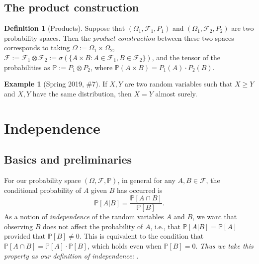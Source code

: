 \documentclass[12pt,reqno]{article}
\renewcommand{\emph}[1]{\textit{#1}}
\theoremstyle{plain}
\theoremstyle{definition}
\newtheorem{definition}[theorem]{Definition}
\newtheorem{example}[theorem]{Example}
\begin{document}
\subsection{The product construction} 

\begin{definition}[Products]
Suppose that $(\Omega_1, \mathcal{F}_1, P_1)$ and 
$(\Omega_1, \mathcal{F}_2, P_2)$ are two probability spaces. 
Then the \emph{product construction} between these two spaces 
corresponds to taking $\Omega := \Omega_1 \times \Omega_2$, 
$\mathcal{F} := \mathcal{F}_1 \otimes \mathcal{F}_2 := \sigma( 
 \{A \times B: A \in \mathcal{F}_1, B \in \mathcal{F}_2\})$, and the 
tensor of the probabilities as $\mathbb{P} := P_1 \otimes P_2$, where 
$\mathbb{P}(A \times B) = P_1(A) \cdot P_2(B)$. 
\end{definition} 

\begin{example}[Spring 2019, \#7]
If $X,Y$ are two random variables such that $X \geq Y$ and $X,Y$ have the 
same distribution, then $X = Y$ almost surely. 
\end{example} 

\newpage 
\section{Independence} 

\subsection{Basics and preliminaries}

For our probability space $(\Omega, \mathcal{F}, \mathbb{P})$, in general for 
any $A,B \in \mathcal{F}$, the conditional probability of $A$ given $B$ has 
occurred is 
\[
\mathbb{P}[A|B] = \frac{\mathbb{P}[A \cap B]}{\mathbb{P}[B]}. 
\]
As a notion of \emph{independence} of the random variables $A$ and $B$, we want that 
observing $B$ does not affect the probability of $A$, i.e., that 
$\mathbb{P}[A|B] = \mathbb{P}[A]$ provided that $\mathbb{P}[B] \neq 0$. 
This is equivalent to the condition that $\mathbb{P}[A \cap B] = \mathbb{P}[A] \cdot \mathbb{P}[B]$, 
which holds even when $\mathbb{P}[B] = 0$. 
\emph{Thus we take this property as our definition of independence: } 
. 
\end{document}
